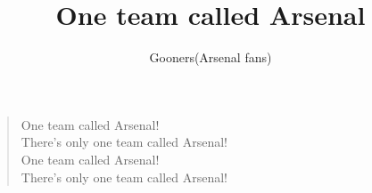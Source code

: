 \documentclass[a4paper,12pt]{article}
\title{One team called Arsenal}
\author{Gooners(Arsenal fans)}
\date{}
\begin{document}
	
	\maketitle
	
	\begin{verse}
		
		One team called Arsenal! \\
		There's only one team called Arsenal! \\
		One team called Arsenal! \\
		There's only one team called Arsenal!
		
	\end{verse}
	
\end{document}
